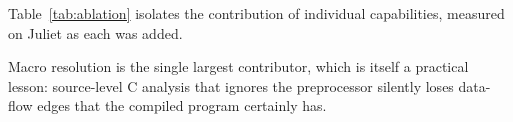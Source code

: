 \documentclass[10pt,conference]{IEEEtran}
\begin{document}
Table~\ref{tab:ablation} isolates the contribution of individual capabilities,
measured on Juliet as each was added.

\begin{table}[t]
\centering
\caption{Ablation on Juliet (case-level), measured during development.}
\label{tab:ablation}
\footnotesize
{}
\end{table}

Macro resolution is the single largest contributor, which is itself a
practical lesson: source-level C analysis that ignores the preprocessor
silently loses data-flow edges that the compiled program certainly has.

\end{document}
